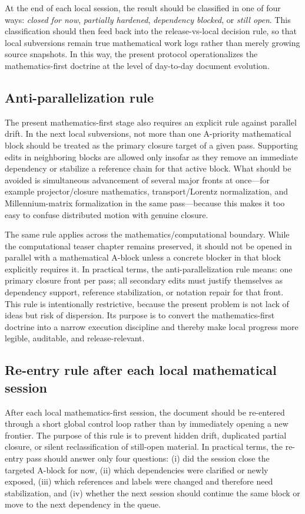 At the end of each local session, the result should be classified in one of four ways: \emph{closed for now}, \emph{partially hardened}, \emph{dependency blocked}, or \emph{still open}. This classification should then feed back into the release-vs-local decision rule, so that local subversions remain true mathematical work logs rather than merely growing source snapshots. In this way, the present protocol operationalizes the mathematics-first doctrine at the level of day-to-day document evolution.



\subsection*{Anti-parallelization rule}
The present mathematics-first stage also requires an explicit rule against parallel drift. In the next local subversions, not more than one A-priority mathematical block should be treated as the primary closure target of a given pass. Supporting edits in neighboring blocks are allowed only insofar as they remove an immediate dependency or stabilize a reference chain for that active block. What should be avoided is simultaneous advancement of several major fronts at once---for example projector/closure mathematics, transport/Lorentz normalization, and Millennium-matrix formalization in the same pass---because this makes it too easy to confuse distributed motion with genuine closure.

The same rule applies across the mathematics/computational boundary. While the computational teaser chapter remains preserved, it should not be opened in parallel with a mathematical A-block unless a concrete blocker in that block explicitly requires it. In practical terms, the anti-parallelization rule means: one primary closure front per pass; all secondary edits must justify themselves as dependency support, reference stabilization, or notation repair for that front. This rule is intentionally restrictive, because the present problem is not lack of ideas but risk of dispersion. Its purpose is to convert the mathematics-first doctrine into a narrow execution discipline and thereby make local progress more legible, auditable, and release-relevant.



\subsection{Re-entry rule after each local mathematical session}
After each local mathematics-first session, the document should be re-entered through a short global control loop rather than by immediately opening a new frontier. The purpose of this rule is to prevent hidden drift, duplicated partial closure, or silent reclassification of still-open material. In practical terms, the re-entry pass should answer only four questions: (i) did the session close the targeted A-block for now, (ii) which dependencies were clarified or newly exposed, (iii) which references and labels were changed and therefore need stabilization, and (iv) whether the next session should continue the same block or move to the next dependency in the queue.

